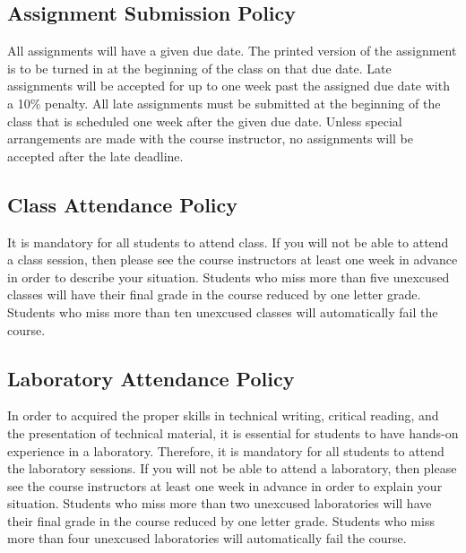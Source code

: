 \subsection*{Assignment Submission Policy}

All assignments will have a given due date. The printed version of the
assignment is to be turned in at the beginning of the class on that due
date. Late assignments will be accepted for up to one week past the
assigned due date with a 10\% penalty. All late assignments must be
submitted at the beginning of the class that is scheduled one week after
the given due date. Unless special arrangements are made with the course
instructor, no assignments will be accepted after the late deadline.

\subsection*{Class Attendance Policy}

It is mandatory for all students to attend class. If you will not be
able to attend a class session, then please see the course instructors at
least one week in advance in order to describe your situation. Students
who miss more than five unexcused classes will have their final grade in
the course reduced by one letter grade. Students who miss more than ten
unexcused classes will automatically fail the course.

\subsection*{Laboratory Attendance Policy}

In order to acquired the proper skills in technical writing, critical
reading, and the presentation of technical material, it is essential
for students to have hands-on experience in a laboratory. Therefore,
it is mandatory for all students to attend the laboratory sessions. If
you will not be able to attend a laboratory, then please see the
course instructors at least one week in advance in order to explain
your situation. Students who miss more than two unexcused laboratories
will have their final grade in the course reduced by one letter grade.
Students who miss more than four unexcused laboratories will
automatically fail the course.

